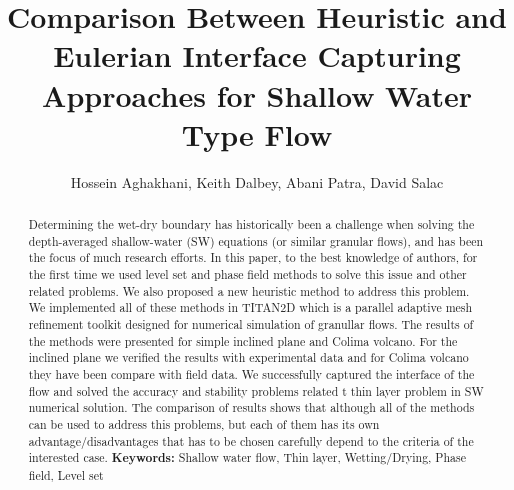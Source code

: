 \documentclass[letterpaper,10pt]{article}
\title{Comparison Between Heuristic and Eulerian Interface Capturing Approaches for Shallow Water Type Flow}
\author{Hossein Aghakhani, Keith Dalbey, Abani Patra, David Salac}
\date{}
\begin{document}
\maketitle

\begin {abstract}{
Determining the wet-dry boundary has historically been a challenge when 
solving the depth-averaged shallow-water (SW) equations (or similar granular flows), and has 
been the focus of much research efforts. In this paper, to the best knowledge of authors, for the first time we used level set and phase field methods to solve this issue and other related problems. We also proposed a new heuristic method to address this problem. We implemented all of these methods in TITAN2D which is a parallel adaptive mesh refinement toolkit designed for numerical simulation of granullar flows.\newline
The results of the methods were presented for simple inclined plane and Colima volcano. For the inclined plane we verified the results with experimental data and for Colima volcano they have been compare with field data. We successfully captured the interface of the flow and solved the accuracy and stability problems related t thin layer problem in SW numerical solution. The comparison of results shows that although all of the methods can be used to address this problems, but each of them has its own advantage/disadvantages that has to be chosen carefully depend to the criteria of the interested case.\newline
\textbf{Keywords:} Shallow water flow, Thin layer, Wetting/Drying, Phase field, Level set}
\end{abstract}

\end{document}
